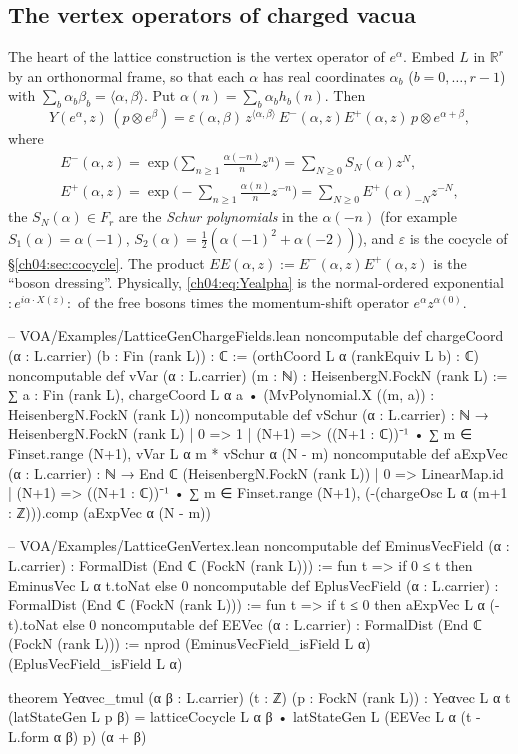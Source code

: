 \subsection{The vertex operators of charged vacua}

The heart of the lattice construction is the vertex operator of $e^\alpha$. Embed $L$ in $\mathbb{R}^r$
by an orthonormal frame, so that each $\alpha$ has real coordinates $\alpha_b$ ($b=0,\dots,r-1$)
with $\sum_b\alpha_b\beta_b=\langle\alpha,\beta\rangle$. Put $\alpha(n)=\sum_b\alpha_b h_b(n)$. Then
\begin{equation}\label{ch04:eq:Yealpha}
  Y(e^\alpha,z)\,(p\otimes e^\beta)
  =\varepsilon(\alpha,\beta)\, z^{\langle\alpha,\beta\rangle}\,
  E^-(\alpha,z)E^+(\alpha,z)\,p\otimes e^{\alpha+\beta},
\end{equation}
where
\begin{gather*}
  E^-(\alpha,z)=\exp\Big(\sum_{n\ge1}\frac{\alpha(-n)}{n}z^n\Big)=\sum_{N\ge0}S_N(\alpha)z^N,
  \\
  E^+(\alpha,z)=\exp\Big(-\sum_{n\ge1}\frac{\alpha(n)}{n}z^{-n}\Big)=\sum_{N\ge0}E^+(\alpha)_{-N}z^{-N},
\end{gather*}
the $S_N(\alpha)\in F_r$ are the \emph{Schur polynomials} in the $\alpha(-n)$ (for example
$S_1(\alpha)=\alpha(-1)$, $S_2(\alpha)=\tfrac12(\alpha(-1)^2+\alpha(-2))$), and $\varepsilon$ is the
cocycle of \S\ref{ch04:sec:cocycle}. The product $EE(\alpha,z):=E^-(\alpha,z)E^+(\alpha,z)$ is the
``boson dressing''. Physically, \eqref{ch04:eq:Yealpha} is the normal-ordered exponential
$:\!e^{i\alpha\cdot X(z)}\!:$ of the free bosons times the momentum-shift operator $e^\alpha
z^{\alpha(0)}$.

\begin{leancode}
-- VOA/Examples/LatticeGenChargeFields.lean
noncomputable def chargeCoord (α : L.carrier) (b : Fin (rank L)) : ℂ :=
  (orthCoord L α (rankEquiv L b) : ℂ)
noncomputable def vVar (α : L.carrier) (m : ℕ) : HeisenbergN.FockN (rank L) :=
  ∑ a : Fin (rank L), chargeCoord L α a • (MvPolynomial.X ((m, a)) : HeisenbergN.FockN (rank L))
noncomputable def vSchur (α : L.carrier) : ℕ → HeisenbergN.FockN (rank L)
  | 0 => 1
  | (N+1) => ((N+1 : ℂ))⁻¹ • ∑ m ∈ Finset.range (N+1), vVar L α m * vSchur α (N - m)
noncomputable def aExpVec (α : L.carrier) : ℕ → End ℂ (HeisenbergN.FockN (rank L))
  | 0 => LinearMap.id
  | (N+1) => ((N+1 : ℂ))⁻¹ • ∑ m ∈ Finset.range (N+1),
      (-(chargeOsc L α (m+1 : ℤ))).comp (aExpVec α (N - m))

-- VOA/Examples/LatticeGenVertex.lean
noncomputable def EminusVecField (α : L.carrier) : FormalDist (End ℂ (FockN (rank L))) :=
  fun t => if 0 ≤ t then EminusVec L α t.toNat else 0
noncomputable def EplusVecField (α : L.carrier) : FormalDist (End ℂ (FockN (rank L))) :=
  fun t => if t ≤ 0 then aExpVec L α (-t).toNat else 0
noncomputable def EEVec (α : L.carrier) : FormalDist (End ℂ (FockN (rank L))) :=
  nprod (EminusVecField_isField L α) (EplusVecField_isField L α)

theorem Yeαvec_tmul (α β : L.carrier) (t : ℤ) (p : FockN (rank L)) :
    Yeαvec L α t (latStateGen L p β)
      = latticeCocycle L α β • latStateGen L (EEVec L α (t - L.form α β) p) (α + β)
\end{leancode}

